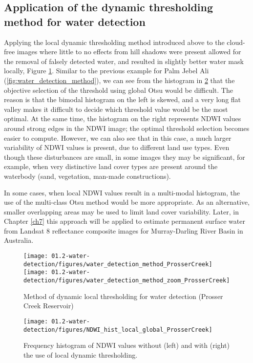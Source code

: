 \subsection{Application of the dynamic thresholding method for water detection}

Applying the local dynamic thresholding method introduced above to the cloud-free images where little to no effects from hill shadows were present allowed for the removal of falsely detected water, and resulted in slightly better water mask locally, Figure \ref{fig:water_detection_method_PC}. Similar to the previous example for Palm Jebel Ali (\ref{fig:water_detection_method}), we can see from the histogram in \ref{fig:water_detection_method_local_water_hist_PC} that the objective selection of the threshold using global Otsu would be difficult. The reason is that the bimodal histogram on the left is skewed, and a very long flat valley makes it difficult to decide which threshold value would be the most optimal. At the same time, the histogram on the right represents NDWI values around strong edges in the NDWI image; the optimal threshold selection becomes easier to compute. However, we can also see that in this case, a much larger variability of NDWI values is present, due to different land use types. Even though these disturbances are small, in some images they may be significant, for example, when very distinctive land cover types are present around the waterbody (sand, vegetation, man-made constructions). 

In some cases, when local NDWI values result in a multi-modal histogram, the use of the multi-class Otsu method would be more appropriate. As an alternative, smaller overlapping areas may be used to limit land cover variability. Later, in Chapter \ref{ch7} this approach will be applied to estimate permanent surface water from Landsat 8 reflectance composite images for Murray-Darling River Basin in Australia. 

\begin{figure}[H]
	\centering
	\texttt{[image: 01.2-water-detection/figures/water\_detection\_method\_ProsserCreek]}
	\texttt{[image: 01.2-water-detection/figures/water\_detection\_method\_zoom\_ProsserCreek]}
	\caption{Method of dynamic local thresholding for water detection (Prosser Creek Reservoir)}
	\label{fig:water_detection_method_PC}
\end{figure}

\begin{figure}[H]
	\centering
	\texttt{[image: 01.2-water-detection/figures/NDWI\_hist\_local\_global\_ProsserCreek]}
	\caption{Frequency histogram of NDWI values without (left) and with (right) the use of local dynamic thresholding.}
	\label{fig:water_detection_method_local_water_hist_PC}
\end{figure}

